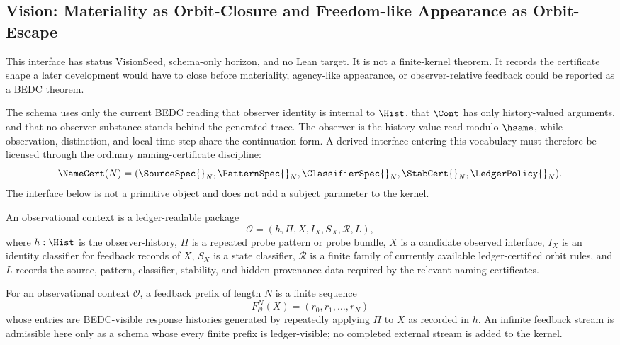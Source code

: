 \subsection{Vision: Materiality as Orbit-Closure and Freedom-like Appearance as Orbit-Escape}
\label{subsec:philosophy-materiality-orbit-escape}

\begin{remark}
\label{rem:philosophy-materiality-orbit-escape-status}
This interface has status VisionSeed, schema-only horizon, and no Lean
target. It is not a finite-kernel theorem. It records the certificate
shape a later development would have to close before materiality,
agency-like appearance, or observer-relative feedback could be reported
as a BEDC theorem.
\end{remark}

The schema uses only the current BEDC reading that observer identity is
internal to $\Hist$, that $\Cont$ has only history-valued arguments, and
that no observer-substance stands behind the generated trace. The
observer is the history value read modulo $\hsame$, while observation,
distinction, and local time-step share the continuation form. A
derived interface entering this vocabulary must therefore be licensed
through the ordinary naming-certificate discipline:
$$
\NameCert(N)=
(\SourceSpec{}_{N},\PatternSpec{}_{N},\ClassifierSpec{}_{N},
\StabCert{}_{N},\LedgerPolicy{}_{N}).
$$
The interface below is not a primitive object and does not add a
subject parameter to the kernel.

\begin{definition}
\label{def:philosophy-observational-context}
An observational context is a ledger-readable package
$$
\mathcal O=(h,\Pi,X,I_X,S_X,\mathcal R,L),
$$
where $h:\Hist$ is the observer-history, $\Pi$ is a repeated probe
pattern or probe bundle, $X$ is a candidate observed interface, $I_X$
is an identity classifier for feedback records of $X$, $S_X$ is a
state classifier, $\mathcal R$ is a finite family of currently
available ledger-certified orbit rules, and $L$ records the source,
pattern, classifier, stability, and hidden-provenance data required by
the relevant naming certificates.
\end{definition}

\begin{definition}
\label{def:philosophy-feedback-prefix}
For an observational context $\mathcal O$, a feedback prefix of length
$N$ is a finite sequence
$$
F^N_{\mathcal O}(X)=(r_0,r_1,\ldots,r_N)
$$
whose entries are BEDC-visible response histories generated by
repeatedly applying $\Pi$ to $X$ as recorded in $h$. An infinite
feedback stream is admissible here only as a schema whose every finite
prefix is ledger-visible; no completed external stream is added to the
kernel.
\end{definition}

